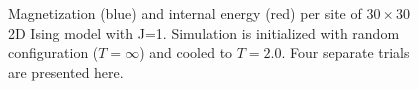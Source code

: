 \documentclass{article}
\begin{document}
\begin{figure}
\hspace{0mm}
\caption{Magnetization (blue) and internal energy (red) per site of $30 \times 30$
2D Ising model with J=1. Simulation is initialized with random configuration
($T = \infty$) and cooled to $T=2.0$. Four separate trials are presented here.}
\end{figure}
\end{document}
